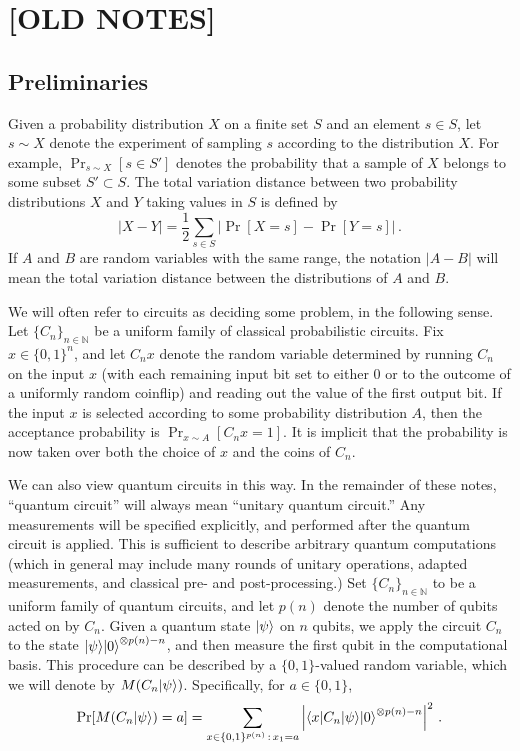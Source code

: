 \documentclass[11pt]{article}
\numberwithin{equation}{section}
\newcommand{\N}{\mathbb{N}}
\begin{document}
{%
\section{[OLD NOTES]}

\subsection{Preliminaries}
Given a probability distribution $X$ on a finite set $S$ and an element $s \in S$, let $s \sim X$ denote the experiment of sampling $s$ according to the distribution $X$. For example, $\Pr_{s \sim X} [s \in S']$ denotes the probability that a sample of $X$ belongs to some subset $S' \subset S$. The total variation distance between two probability distributions $X$ and $Y$ taking values in $S$ is defined by
$$
|X - Y| = \frac{1}{2} \sum_{s \in S} \bigl|\Pr[X=s] - \Pr[Y=s]\bigr|\,.
$$
If $A$ and $B$ are random variables with the same range, the notation $|A-B|$ will mean the total variation distance between the distributions of $A$ and $B$.


We will often refer to circuits as deciding some problem, in the following sense. Let $\{C_n\}_{n \in \N}$ be a uniform family of classical probabilistic circuits. Fix $x \in \{0,1\}^n$, and let $C_n x$ denote the random variable determined by running $C_n$ on the input $x$ (with each remaining input bit set to either $0$ or to the outcome of a uniformly random coinflip) and reading out the value of the first output bit. If the input $x$ is selected according to some probability distribution $A$, then the acceptance probability is $\Pr_{x \sim A}[C_n x = 1]$. It is implicit that the probability is now taken over both the choice of $x$ and the coins of $C_n$.

We can also view quantum circuits in this way. In the remainder of these notes, ``quantum circuit'' will always mean ``unitary quantum circuit.'' Any measurements will be specified explicitly, and performed after the quantum circuit is applied. This is sufficient to describe arbitrary quantum computations (which in general may include many rounds of unitary operations, adapted measurements, and classical pre- and post-processing.) Set $\{C_n\}_{n \in \N}$ to be a uniform family of quantum circuits, and let $p(n)$ denote the number of qubits acted on by $C_n$. Given a quantum state ${\left\vert{\psi}\right\rangle}$ on $n$ qubits, we apply the circuit $C_n$ to the state ${\left\vert{\psi}\right\rangle} {\left\vert{0}\right\rangle}^{\otimes p(n)-n}$, and then measure the first qubit in the computational basis. This procedure can be described by a $\{0,1\}$-valued random variable, which we will denote by $M(C_n {\left\vert{\psi}\right\rangle})$. Specifically, for $a \in \{0,1\}$,
$$
\Pr[M(C_n {\left\vert{\psi}\right\rangle}) = a] = \sum_{x \in \{0,1\}^{p(n)}\,:\,x_1 = a} \left| {\left\langle{x}\right\vert} C_n {\left\vert{\psi}\right\rangle} {\left\vert{0}\right\rangle}^{\otimes p(n)-n} \right|^2\,.
$$

}
\end{document}
